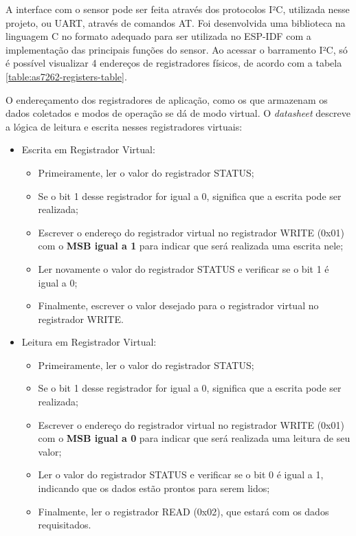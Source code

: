 \documentclass[../monografia.tex]{subfiles}
\begin{document}
A interface com o sensor pode ser feita através dos protocolos I²C, utilizada nesse projeto, ou UART, através de comandos AT. Foi desenvolvida uma biblioteca na linguagem C no formato adequado para ser utilizada no ESP-IDF com a implementação das principais funções do sensor. Ao acessar o barramento I²C, só é possível visualizar 4 endereços de registradores físicos, de acordo com a tabela \ref{table:as7262-registers-table}.

O endereçamento dos registradores de aplicação, como os que armazenam os dados coletados e modos de operação se dá de modo virtual. O \textit{datasheet} descreve a lógica de leitura e escrita nesses registradores virtuais:

\begin{itemize}
\item Escrita em Registrador Virtual:
	\begin{itemize}
		\item Primeiramente, ler o valor do registrador STATUS;
		\item Se o bit 1 desse registrador for igual a 0, significa que a escrita pode ser realizada;
		\item Escrever o endereço do registrador virtual no registrador WRITE (0x01) com o \textbf{MSB igual a 1} para indicar que será realizada uma escrita nele;
		\item Ler novamente o valor do registrador STATUS e verificar se o bit 1 é igual a 0;
		\item Finalmente, escrever o valor desejado para o registrador virtual no registrador WRITE.
	\end{itemize}
	
\item Leitura em Registrador Virtual:
	\begin{itemize}
		\item Primeiramente, ler o valor do registrador STATUS;
		\item Se o bit 1 desse registrador for igual a 0, significa que a escrita pode ser realizada;
		\item Escrever o endereço do registrador virtual no registrador WRITE (0x01) com o \textbf{MSB igual a 0} para indicar que será realizada uma leitura de seu valor;
		\item Ler o valor do registrador STATUS e verificar se o bit 0 é igual a 1, indicando que os dados estão prontos para serem lidos;
		\item Finalmente, ler o registrador READ (0x02), que estará com os dados requisitados.
	\end{itemize}
\end{itemize}
\end{document}
